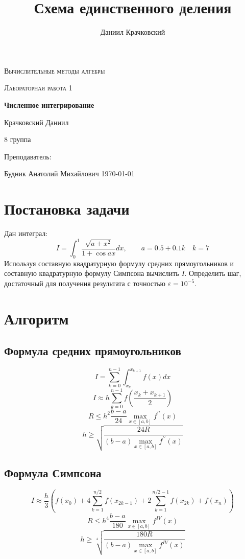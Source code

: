 \documentclass[12pt]{article}
\author{Даниил Крачковский}
\title{Схема единственного деления}
\begin{document}
	\begin{titlepage}
		\centering
		{\scshape\LARGE Вычислительные методы алгебры \par}
		\vfill
		{\scshape\Large Лабораторная работа 1 \par}
		\vspace{1cm}
		{\huge\bfseries Численное интегрирование \par}
		\vspace{2cm}
		{\Large Крачковский Даниил\par}
		8 группа \par
		\vspace{0.5cm}
		Преподаватель:\par
		Будник Анатолий Михайлович
		\vfill
		{\large \today}
	\end{titlepage}
\section{Постановка задачи}
	Дан интеграл:
	\begin{equation}
		I = \int_0^1 \frac{\sqrt{a + x^2}}{1 + \cos ax} d x, \qquad a = 0.5 + 0.1k \quad k = 7
	\end{equation}
	Используя составную квадратурную формулу средних прямоугольников и составную квадратурную формулу Симпсона вычислить $I$. Определить шаг, достаточный для получения результата с точностью $\varepsilon = 10^{-5}$.
\section{Алгоритм}
	\subsection*{Формула средних прямоугольников}
	\[
		I = \sum_{k=0}^{n-1} \int_{x_k}^{x_{k+1}} f(x)dx 
	\]
	\[
		I \approx h  \sum_{k=0}^{n-1} f(\frac{x_k + x_{k+1}}{2})
	\]
	\[
		R \leq h^2 \frac{b-a}{24} \max_{x \in [a, b]} f^{\prime\prime} (x)
	\]
	\[
		h \geq \sqrt{\frac{24R}{(b-a) \max_{x \in [a, b]} f^{\prime\prime} (x)} }
	\]
	\subsection*{Формула Симпсона}
	\[
		I \approx \frac{h}{3} \left(f(x_0) + 4 \sum_{k=1}^{n/2} f(x_{2k -1}) + 2 \sum_{k=1}^{n/2 - 1} f(x_{2k}) + f(x_n)\right)
	\]
	\[
		R \leq h^4 \frac{b-a}{180} \max_{x \in [a, b]} f^{IV} (x)
	\]
	\[
		h \geq \sqrt[4]{\frac{180R}{(b-a) \max_{x \in [a, b]} f^{IV} (x)} }
	\]
	
\end{document}
